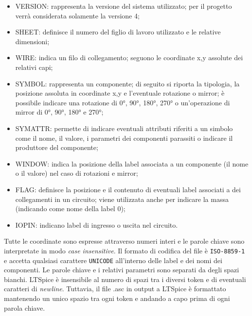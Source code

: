 \begin{itemize}
	\item VERSION: rappresenta la versione del sistema utilizzato; per il progetto verrà considerata solamente la versione 4;
	\item SHEET: definisce il numero del figlio di lavoro utilizzato e le relative dimensioni;
	\item WIRE: indica un filo di collegamento; seguono le coordinate x,y assolute dei relativi capi;
	\item SYMBOL: rappresenta un componente; di seguito si riporta la tipologia, la posizione assoluta in coordinate x,y e l'eventuale rotazione o mirror; è possibile indicare una rotazione di 0°, 90°, 180°, 270° o un'operazione di mirror di 0°, 90°, 180° e 270°;
	\item SYMATTR: permette di indicare eventuali attributi riferiti a un simbolo come il nome, il valore, i parametri dei componenti parassiti o indicare il produttore del componente;
	\item WINDOW: indica la posizione della label associata a un componente (il nome o il valore) nel caso di rotazioni e mirror;
	\item FLAG: definisce la posizione e il contenuto di eventuali label associati a dei collegamenti in un circuito; viene utilizzata anche per indicare la massa (indicando come nome della label 0);
	\item IOPIN: indicano label di ingresso o uscita nel circuito. 
\end{itemize}
Tutte le coordinate sono espresse attraverso numeri interi e le parole chiave sono interpretate in modo \textit{case insensitive}. Il formato di codifica del file è \texttt{ISO-8859-1} e accetta qualsiasi carattere \texttt{UNICODE} all'interno delle label e dei nomi dei componenti. Le parole chiave e i relativi parametri sono separati da degli spazi bianchi. LTSpice è insensibile al numero di spazi tra i diversi token e di eventuali caratteri di \textit{newline}. Tuttavia, il file .asc in output a LTSpice è formattato mantenendo un unico spazio tra ogni token e andando a capo prima di ogni parola chiave.

